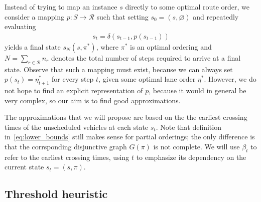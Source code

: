 \documentclass[a4paper]{article}
\theoremstyle{definition}
\theoremstyle{plain}
\begin{document}
Instead of trying to map an instance $s$ directly to some optimal route order, we consider
a mapping $p : S \rightarrow \mathcal{R}$ such that setting $s_{0} = (s, \varnothing)$ and repeatedly
evaluating
\begin{align*}
  s_{t} = \delta(s_{t-1}, p(s_{t-1}))
\end{align*}
yields a final state $s_{N}(s, \pi^{*})$, where $\pi^{*}$ is an optimal ordering and
$N = \sum_{r \in \mathcal{R}} n_{r}$ denotes the total number of steps required
to arrive at a final state.
%
Observe that such a mapping must exist, because we can always set
$p(s_{t}) = \eta^{*}_{t+1}$ for every step $t$, given some optimal lane order
$\eta^{*}$. However, we do not hope to find an explicit representation of $p$,
because it would in general be very complex, so our aim is to find good
approximations.

The approximations that we will propose are based on the the earliest crossing
times of the unscheduled vehicles at each state $s_{t}$. Note that definition
in~\eqref{eq:lower_bounds} still makes sense for partial orderings; the only
difference is that the corrsponding disjunctive graph $G(\pi)$ is not complete.
We will use $\beta_{t}$ to refer to the earliest crossing times,
using $t$ to emphasize its dependency on the current state $s_{t} = (s, \pi)$.


\subsection{Threshold heuristic}
\end{document}
